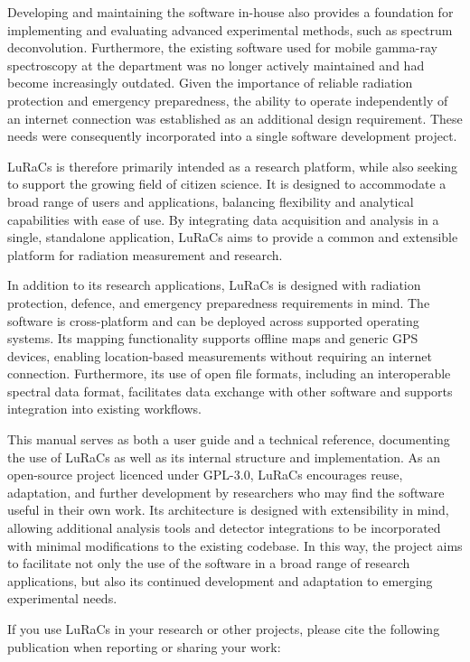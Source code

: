 Developing and maintaining the software in-house also provides a foundation for implementing and evaluating advanced experimental methods, such as spectrum deconvolution. Furthermore, the existing software used for mobile gamma-ray spectroscopy at the department was no longer actively maintained and had become increasingly outdated. Given the importance of reliable radiation protection and emergency preparedness, the ability to operate independently of an internet connection was established as an additional design requirement. These needs were consequently incorporated into a single software development project.

LuRaCs is therefore primarily intended as a research platform, while also seeking to support the growing field of citizen science. It is designed to accommodate a broad range of users and applications, balancing flexibility and analytical capabilities with ease of use. By integrating data acquisition and analysis in a single, standalone application, LuRaCs aims to provide a common and extensible platform for radiation measurement and research.

In addition to its research applications, LuRaCs is designed with radiation protection, defence, and emergency preparedness requirements in mind. The software is cross-platform and can be deployed across supported operating systems. Its mapping functionality supports offline maps and generic GPS devices, enabling location-based measurements without requiring an internet connection. Furthermore, its use of open file formats, including an interoperable spectral data format, facilitates data exchange with other software and supports integration into existing workflows.

This manual serves as both a user guide and a technical reference, documenting the use of LuRaCs as well as its internal structure and implementation. As an open-source project licenced under GPL-3.0, LuRaCs encourages reuse, adaptation, and further development by researchers who may find the software useful in their own work. Its architecture is designed with extensibility in mind, allowing additional analysis tools and detector integrations to be incorporated with minimal modifications to the existing codebase. In this way, the project aims to facilitate not only the use of the software in a broad range of research applications, but also its continued development and adaptation to emerging experimental needs.

If you use LuRaCs in your research or other projects, please cite the following publication when reporting or sharing your work:

